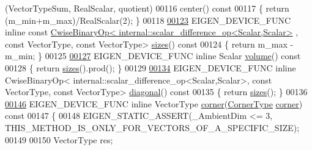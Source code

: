 \begin{DoxyCode}
      (VectorTypeSum, RealScalar, quotient)
00116   center()\textcolor{keyword}{ const}
00117 \textcolor{keyword}{  }\{ \textcolor{keywordflow}{return} (m\_min+m\_max)/RealScalar(2); \}
00118 
\hyperlink{group___geometry___module_a139c2e08625f54e4c6b0007257afdae2}{00123}   EIGEN\_DEVICE\_FUNC \textcolor{keyword}{inline} \textcolor{keyword}{const} 
      \hyperlink{group___core___module_class_eigen_1_1_cwise_binary_op}{CwiseBinaryOp< internal::scalar\_difference\_op<Scalar,Scalar>}
      , \textcolor{keyword}{const} VectorType, \textcolor{keyword}{const} VectorType> \hyperlink{group___geometry___module_a139c2e08625f54e4c6b0007257afdae2}{sizes}()\textcolor{keyword}{ const}
00124 \textcolor{keyword}{  }\{ \textcolor{keywordflow}{return} m\_max - m\_min; \}
00125 
\hyperlink{group___geometry___module_af737027346c35a1c3027d36c9c891dc5}{00127}   EIGEN\_DEVICE\_FUNC \textcolor{keyword}{inline} Scalar \hyperlink{group___geometry___module_af737027346c35a1c3027d36c9c891dc5}{volume}()\textcolor{keyword}{ const}
00128 \textcolor{keyword}{  }\{ \textcolor{keywordflow}{return} \hyperlink{group___geometry___module_a139c2e08625f54e4c6b0007257afdae2}{sizes}().prod(); \}
00129 
\hyperlink{group___geometry___module_a37ff7dfbe2d9aff6920c7f92b02af8d4}{00134}   EIGEN\_DEVICE\_FUNC \textcolor{keyword}{inline} CwiseBinaryOp< internal::scalar\_difference\_op<Scalar,Scalar>, \textcolor{keyword}{const} VectorType, \textcolor{keyword}{
      const} VectorType> \hyperlink{group___geometry___module_a37ff7dfbe2d9aff6920c7f92b02af8d4}{diagonal}()\textcolor{keyword}{ const}
00135 \textcolor{keyword}{  }\{ \textcolor{keywordflow}{return} \hyperlink{group___geometry___module_a139c2e08625f54e4c6b0007257afdae2}{sizes}(); \}
00136 
\hyperlink{group___geometry___module_a32e631ff4bfb088e664f696034e63100}{00146}   EIGEN\_DEVICE\_FUNC \textcolor{keyword}{inline} VectorType \hyperlink{group___geometry___module_a32e631ff4bfb088e664f696034e63100}{corner}(\hyperlink{group___geometry___module_ae4aa935b36004fffc49c7a3a85e2d378}{CornerType} \hyperlink{group___geometry___module_a32e631ff4bfb088e664f696034e63100}{corner})\textcolor{keyword}{ const}
00147 \textcolor{keyword}{  }\{
00148     EIGEN\_STATIC\_ASSERT(\_AmbientDim <= 3, THIS\_METHOD\_IS\_ONLY\_FOR\_VECTORS\_OF\_A\_SPECIFIC\_SIZE);
00149 
00150     VectorType res;

\end{DoxyCode}
